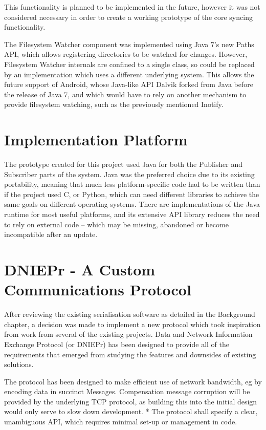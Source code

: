 \documentclass[12pt,a4paper,]{adreport}
\begin{document}
This functionality is planned to be implemented in the future, however
it was not considered necessary in order to create a working prototype
of the core syncing functionality.

The Filesystem Watcher component was implemented using Java 7's new
Paths API, which allows registering directories to be watched for
changes. However, Filesystem Watcher internals are confined to a single
class, so could be replaced by an implementation which uses a different
underlying system. This allows the future support of Android, whose
Java-like API Dalvik forked from Java before the release of Java 7, and
which would have to rely on another mechanism to provide filesystem
watching, such as the previously mentioned Inotify.

\section{Implementation Platform}\label{implementation-platform}

The prototype created for this project used Java for both the Publisher
and Subscriber parts of the system. Java was the preferred choice due to
its existing portability, meaning that much less platform-specific code
had to be written than if the project used C, or Python, which can need
different libraries to achieve the same goals on different operating
systems. There are implementations of the Java runtime for most useful
platforms, and its extensive API library reduces the need to rely on
external code -- which may be missing, abandoned or become incompatible
after an update.

\section{DNIEPr - A Custom Communications
Protocol}\label{dniepr---a-custom-communications-protocol}

After reviewing the existing serialisation software as detailed in the
Background chapter, a decision was made to implement a new protocol
which took inspiration from work from several of the existing projects.
Data and Network Information Exchange Protocol (or DNIEPr) has been
designed to provide all of the requirements that emerged from studying
the features and downsides of existing solutions.

The protocol has been designed to make efficient use of network
bandwidth, eg by encoding data in succinct Messages. Compensation
message corruption will be provided by the underlying TCP protocol, as
building this into the initial design would only serve to slow down
development. * The protocol shall specify a clear, unambiguous API,
which requires minimal set-up or management in code.
\end{document}
